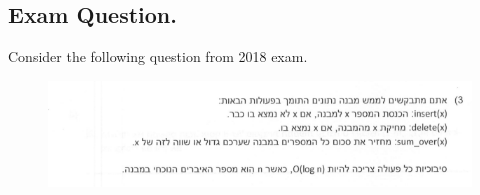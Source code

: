 \newpage
\fi
\subsection{Exam Question.}
Consider the following question from 2018 exam. 
\begin{figure}[h]
  \centering
  \includegraphics[scale=0.8]{avl-q-exam.png}\\
\end{figure}



